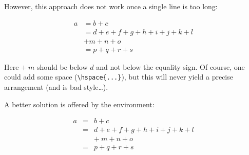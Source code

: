 However, this approach does not work once a single line is too long:
\begin{example}
\begin{align}
  a & = b + c \\
  & = d + e + f + g + h + i 
  + j + k + l \nonumber \\
  & + m + n + o \\
  & = p + q + r + s
\end{align}
\end{example}
\noindent
Here $+\:m$ should be below $d$ and not below the equality sign. Of
course, one could add some space (\verb+\hspace{...}+),
but this will never yield a precise arrangement (and is bad
style\ldots).

A better solution is offered by the  environment:
\begin{example}
\begin{eqnarray}
  a & = & b + c \\
  & = & d + e + f + g + h + i 
  + j + k + l \nonumber \\
  && +\: m + n + o \\
  & = & p + q + r + s
\end{eqnarray}
\end{example}

